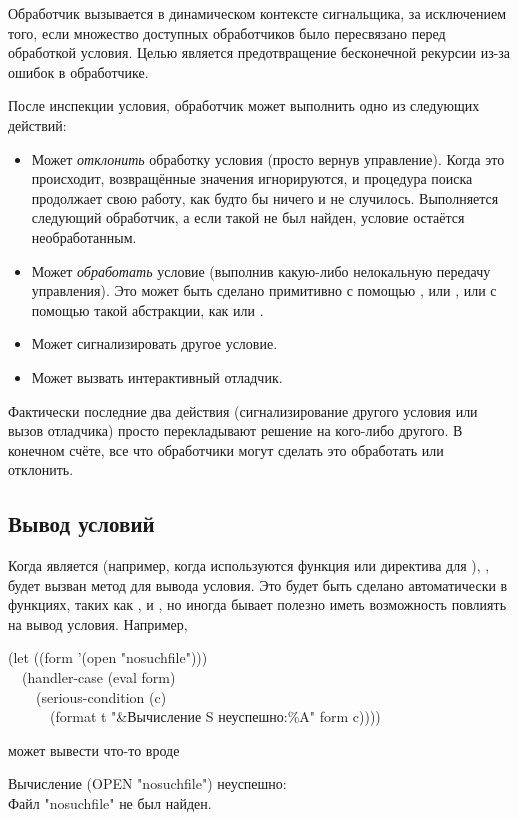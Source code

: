 Обработчик вызывается в динамическом контексте сигнальщика, за исключением того,
если множество доступных обработчиков было пересвязано перед обработкой
условия. Целью является предотвращение бесконечной рекурсии из-за ошибок в
обработчике.

После инспекции условия, обработчик может выполнить одно из следующих действий:
\begin{itemize}
\item Может \emph{отклонить} обработку условия (просто вернув управление). Когда
  это происходит, возвращённые значения игнорируются, и процедура поиска
  продолжает свою работу, как будто бы ничего и не случилось. Выполняется
  следующий обработчик, а если такой не был найден, условие остаётся
  необработанным.
\item Может \emph{обработать} условие (выполнив какую-либо нелокальную передачу
  управления). Это может быть сделано примитивно с помощью ,
   или , или с помощью такой абстракции, как 
  или .
\item Может сигнализировать другое условие.
\item Может вызвать интерактивный отладчик.
\end{itemize}
Фактически последние два действия (сигнализирование другого условия или вызов
отладчика) просто перекладывают решение на кого-либо другого. В конечном счёте,
все что обработчики могут сделать это обработать или отклонить.

\subsection{Вывод условий}

Когда  является  (например, когда используются
функция  или директива  для ), , будет
вызван метод для вывода условия. Это будет быть сделано автоматически в функциях,
таких как ,  и , но иногда бывает
полезно иметь возможность повлиять на вывод условия. Например,
\begin{lisp}
(let ((form '(open "nosuchfile"))) \\
~~(handler-case (eval form) \\
~~~~(serious-condition (c) \\
~~~~~~(format t "{\Xtilde}\&Вычисление {\Xtilde}S неуспешно:{\Xtilde}\%{\Xtilde}A" form c))))
\end{lisp}
может вывести что-то вроде
\begin{lisp}
Вычисление (OPEN "nosuchfile") неуспешно: \\
Файл "nosuchfile" не был найден.
\end{lisp}

